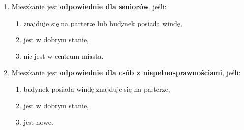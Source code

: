 \begin{enumerate}[label=N\arabic*.]
    \item Mieszkanie jest \textbf{odpowiednie dla seniorów}, jeśli:
    \begin{enumerate}[label=\arabic*.]
        \item znajduje się na parterze lub budynek posiada windę,
        \item jest w dobrym stanie,
        \item nie jest w centrum miasta.
    \end{enumerate}
    \item Mieszkanie jest \textbf{odpowiednie dla osób z niepełnosprawnościami}, jeśli:
    \begin{enumerate}[label=\arabic*.]
        \item budynek posiada windę znajduje się na parterze,
        \item jest w dobrym stanie,
        \item jest nowe.
    \end{enumerate}
\end{enumerate}

